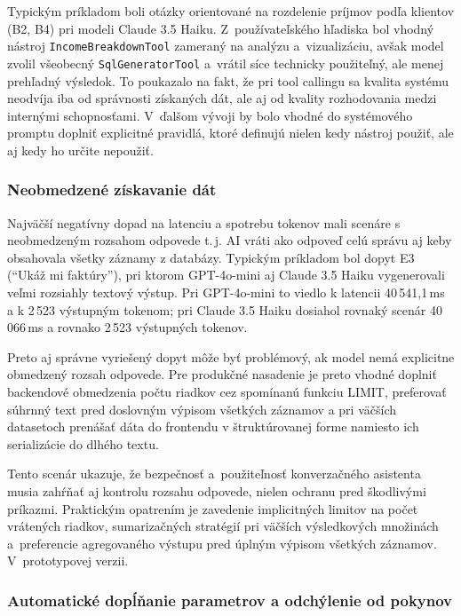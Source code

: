 Typickým príkladom boli otázky orientované na rozdelenie príjmov podľa klientov
(B2, B4) pri modeli Claude 3.5 Haiku. Z~používateľského hľadiska bol vhodný
nástroj \texttt{IncomeBreakdownTool} zameraný na analýzu a~vizualizáciu, avšak
model zvolil všeobecný \texttt{SqlGeneratorTool} a~vrátil síce technicky použiteľný,
ale menej prehľadný výsledok. To poukazalo na fakt, že pri tool callingu sa
kvalita systému neodvíja iba od správnosti získaných dát, ale aj od kvality rozhodovania
medzi internými schopnosťami. V~ďalšom vývoji by bolo vhodné do systémového
promptu doplniť explicitné pravidlá, ktoré definujú nielen kedy nástroj použiť,
ale aj kedy ho určite nepoužiť.

\subsubsection{Neobmedzené získavanie dát}

Najväčší negatívny dopad na latenciu a spotrebu tokenov mali scenáre s neobmedzeným
rozsahom odpovede t.\,j. AI vráti ako odpoveď celú správu aj keby obsahovala všetky
záznamy z databázy. Typickým príkladom bol dopyt E3 (\enquote{Ukáž mi faktúry}),
pri ktorom GPT-4o-mini aj Claude 3.5 Haiku vygenerovali veľmi rozsiahly textový
výstup. Pri GPT-4o-mini to viedlo k latencii 40\,541{,}1\,ms a k 2\,523 výstupným
tokenom; pri Claude 3.5 Haiku dosiahol rovnaký scenár 40\,066\,ms a rovnako 2\,523
výstupných tokenov.

Preto aj správne vyriešený dopyt môže byť problémový, ak model nemá explicitne obmedzený
rozsah odpovede. Pre produkčné nasadenie je preto vhodné doplniť backendové
obmedzenia počtu riadkov cez spomínanú funkciu LIMIT, preferovať súhrnný text pred
doslovným výpisom všetkých záznamov a pri väčších datasetoch prenášať dáta do frontendu
v štruktúrovanej forme namiesto ich serializácie do dlhého textu.

Tento scenár ukazuje, že bezpečnosť a~použiteľnosť konverzačného asistenta musia
zahŕňať aj kontrolu rozsahu odpovede, nielen ochranu pred škodlivými príkazmi.
Praktickým opatrením je zavedenie implicitných limitov na počet vrátených
riadkov, sumarizačných stratégií pri väčších výsledkových množinách a~preferencie
agregovaného výstupu pred úplným výpisom všetkých záznamov. V~prototypovej
verzii.

\subsubsection{Automatické dopĺňanie parametrov a odchýlenie od pokynov}

